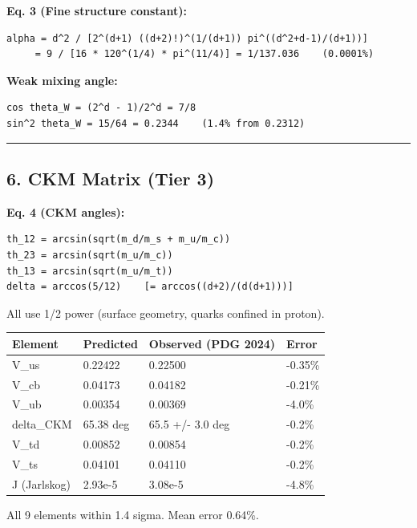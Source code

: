 \documentclass[
]{article}
\newcounter{none} %
\begin{document}
\textbf{Eq. 3 (Fine structure constant):}

\begin{verbatim}
alpha = d^2 / [2^(d+1) ((d+2)!)^(1/(d+1)) pi^((d^2+d-1)/(d+1))]
     = 9 / [16 * 120^(1/4) * pi^(11/4)] = 1/137.036    (0.0001%)
\end{verbatim}

\textbf{Weak mixing angle:}

\begin{verbatim}
cos theta_W = (2^d - 1)/2^d = 7/8
sin^2 theta_W = 15/64 = 0.2344    (1.4% from 0.2312)
\end{verbatim}

\begin{center}\rule{0.5\linewidth}{0.5pt}\end{center}

\subsection{6. CKM Matrix (Tier 3)}\label{ckm-matrix-tier-3}

\textbf{Eq. 4 (CKM angles):}

\begin{verbatim}
th_12 = arcsin(sqrt(m_d/m_s + m_u/m_c))
th_23 = arcsin(sqrt(m_u/m_c))
th_13 = arcsin(sqrt(m_u/m_t))
delta = arccos(5/12)    [= arccos((d+2)/(d(d+1)))]
\end{verbatim}

All use 1/2 power (surface geometry, quarks confined in proton).

{\def\LTcaptype{none} %
\begin{longtable}[]{@{}llll@{}}
\toprule\noalign{}
Element & Predicted & Observed (PDG 2024) & Error \\
\midrule\noalign{}
\endhead
\bottomrule\noalign{}
\endlastfoot
V\_us & 0.22422 & 0.22500 & -0.35\% \\
V\_cb & 0.04173 & 0.04182 & -0.21\% \\
V\_ub & 0.00354 & 0.00369 & -4.0\% \\
delta\_CKM & 65.38 deg & 65.5 +/- 3.0 deg & -0.2\% \\
V\_td & 0.00852 & 0.00854 & -0.2\% \\
V\_ts & 0.04101 & 0.04110 & -0.2\% \\
J (Jarlskog) & 2.93e-5 & 3.08e-5 & -4.8\% \\
\end{longtable}
}

All 9 elements within 1.4 sigma. Mean error 0.64\%.
\end{document}
